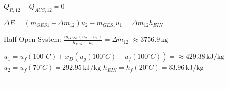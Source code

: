 \( Q_{R,12} - Q_{AUS,12} = 0 \)  

\( \Delta E = (m_{GES1} + \Delta m_{12}) u_2 - m_{GES1} u_1 = \Delta m_{12} h_{EIN} \)  

Half Open System:  
\( \frac{m_{GES1}(u_2 - u_1)}{h_{EIN} - u_2} = \Delta m_{12} \)  
\( \approx 3756.9 \, \text{kg} \)  

\( u_1 = u_f(100^\circ C) + x_D(u_g(100^\circ C) - u_f(100^\circ C)) = \approx 429.38 \, \text{kJ/kg} \)  
\( u_2 = u_f(70^\circ C) = 292.95 \, \text{kJ/kg} \)  
\( h_{EIN} = h_f(20^\circ C) = 83.96 \, \text{kJ/kg} \)  

---